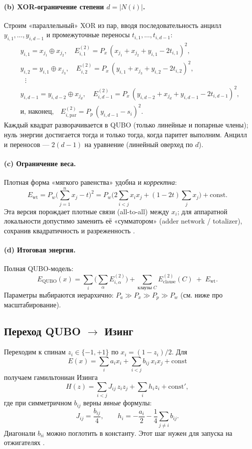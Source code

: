 \paragraph{(b) XOR-ограничение степени $d=|N(i)|$.}
Строим «параллельный» XOR из пар, вводя последовательность анцилл $y_{i,1},\dots,y_{i,d-1}$ и промежуточные переносы $t_{i,1},\dots,t_{i,d-1}$:
\[
\begin{aligned}
&y_{i,1}=x_{j_1}\oplus x_{j_2},\quad E^{(2)}_{i,1}=P_x\,(x_{j_1}+x_{j_2}+y_{i,1}-2t_{i,1})^2,\\
&y_{i,2}=y_{i,1}\oplus x_{j_3},\quad E^{(2)}_{i,2}=P_x\,(y_{i,1}+x_{j_3}+y_{i,2}-2t_{i,2})^2,\\
&\ \ \ \vdots\\
&y_{i,d-1}=y_{i,d-2}\oplus x_{j_d},\quad E^{(2)}_{i,d-1}=P_x\,(y_{i,d-2}+x_{j_d}+y_{i,d-1}-2t_{i,d-1})^2,\\
&\text{и, наконец,}\quad E^{(2)}_{i,\mathrm{par}}=P_p\,(y_{i,d-1}-s_i)^2.
\end{aligned}
\]
Каждый квадрат разворачивается в QUBO (только линейные и попарные члены); нуль энергии достигается тогда и только тогда, когда паритет выполним. Анцилл и переносов — $2(d-1)$ на уравнение (линейный оверхед по $d$).

\paragraph{(c) Ограничение веса.}
Плотная форма «мягкого равенства» удобна и \emph{корректна}:
\[
E_{\mathrm{wt}}=P_w\Big(\sum_{j=1}^n x_j - t\Big)^2
= P_w\Big(2\sum_{i<j}x_i x_j+(1-2t)\sum_j x_j\Big)+\mathrm{const}.
\]
Эта версия порождает плотные связи (all-to-all) между $x_i$; для аппаратной локальности допустимо заменить её «сумматором» (adder network / totalizer), сохранив квадратичность и разреженность \cite{Im2025}.

\paragraph{(d) Итоговая энергия.}
Полная QUBO-модель:
\[
E_{\text{QUBO}}(x)=\sum_{i}\bigg(\sum_{\alpha} E_{i,\alpha}^{(2)}\bigg)+\sum_{\text{клаузы }C}E^{(2)}_{\mathrm{clause}}(C)\;+\;E_{\mathrm{wt}}.
\]
Параметры выбираются иерархично: $P_a\gg P_x\gg P_p\gg P_w$ (см. ниже про масштабирование).

\subsection{Переход QUBO $\rightarrow$ Изинг}
Переходим к спинам $z_i\in\{-1,+1\}$ по $x_i=(1-z_i)/2$. Для
\[
E(x)=\sum_i a_i x_i + \sum_{i<j} b_{ij}\,x_i x_j + \mathrm{const}
\]
получаем гамильтониан Изинга
\[
H(z)=\sum_{i<j} J_{ij}\,z_i z_j + \sum_i h_i z_i + \mathrm{const}',
\]
где при симметричном $b_{ij}$ верны \emph{явные} формулы:
\[
J_{ij}=\frac{b_{ij}}{4},\qquad
h_i=-\frac{a_i}{2}-\frac{1}{4}\sum_{j\ne i} b_{ij}.
\]
Диагонали $b_{ii}$ можно поглотить в константу. Этот шаг нужен для запуска на отжигателях \cite{Bian2018,Sirdey2023,Pei2025}.

